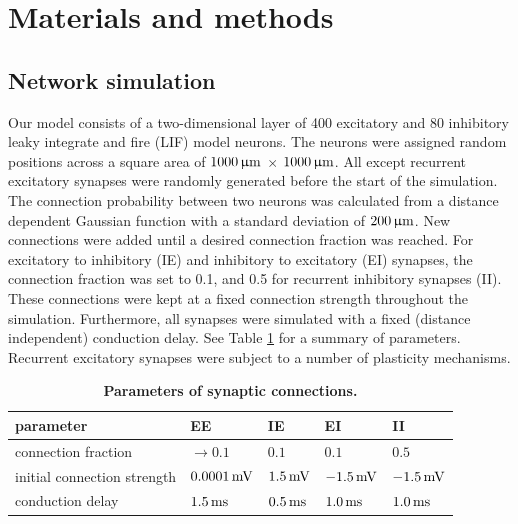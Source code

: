 \documentclass[10pt,letterpaper]{article}
\begin{document}
\section*{Materials and methods}
\subsection*{Network simulation} \label{network simulation}

Our model consists of a two-dimensional layer of 400 excitatory and 80 inhibitory  leaky integrate and fire (LIF) model neurons. The neurons were assigned random positions across a square area of $1000 \, \rm \upmu m$ $\times$  $1000 \, \rm \upmu m$. All except recurrent excitatory synapses were randomly generated before the start of the simulation. The connection probability between two neurons was calculated from a distance dependent Gaussian function with a standard deviation of $\rm 200\, \upmu m$. New connections were added until a desired connection fraction was reached. For excitatory to inhibitory (IE) and inhibitory to excitatory (EI) synapses, the connection fraction was set to 0.1, and 0.5 for recurrent inhibitory synapses (II). These connections were kept at a fixed connection strength throughout the simulation. Furthermore, all synapses were simulated with a fixed (distance independent) conduction delay. See Table \ref{syn_conn_params} for a summary of parameters. Recurrent excitatory synapses were subject to a number of plasticity mechanisms. 

\begin{table}
\caption{\bf Parameters of synaptic connections.}
\begin{tabular}{|l|l|l|l|l|}
\hline
\textbf{parameter} & \textbf{EE} & \textbf{IE} & \textbf{EI} & \textbf{II} \\ \hline
connection fraction & $\rightarrow 0.1$ & $0.1$ & $0.1$ & $0.5$ \\ \hline
initial connection strength & $\rm 0.0001\, mV$ & $\rm 1.5\, mV$ & $\rm -1.5\, mV$ & $\rm -1.5\, mV$ \\ \hline
conduction delay & $\rm 1.5\, ms$ & $\rm 0.5\, ms$ & $\rm 1.0\, ms$ & $\rm 1.0\, ms$ \\
\hline
\end{tabular}
\label{syn_conn_params}
\end{table}
\end{document}
